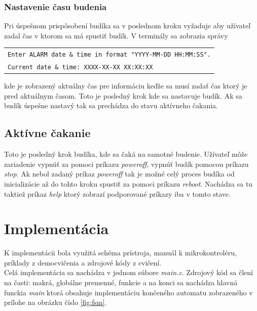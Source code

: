 \documentclass[11pt,a4paper]{article}
\begin{document}
        \subsubsection{Nastavenie času budenia}

            \indent Pri úspešnom prispôsobení budíka sa v poslednom kroku vyžaduje aby užívateľ zadal čas v ktorom sa má spustiť budík. V terminály sa zobrazia správy
            \begin{center}
                \begin{tabular}{l}
                    \texttt{Enter ALARM date \& time in format "YYYY-MM-DD HH:MM:SS".}\\
                    \texttt{Current date \& time: XXXX-XX-XX XX:XX:XX}
                \end{tabular}
            \end{center}
            kde je zobrazený aktuálny čas pre informáciu keďže sa musí zadať čas ktorý je pred aktuálnym časom. Toto je posledný krok kde sa nastavuje budík. Ak sa budík úspešne nastavý tak sa prechádza do stavu aktívneho čakania.

        \subsection{Aktívne čakanie}

            \indent Toto je posledný krok budíka, kde sa čaká na samotné budenie. Užívateľ môže zariadenie vypnúť za pomoci príkazu \textit{poweroff}, vypnúť budík pomocou príkazu \textit{stop}. Ak nebol zadaný príkaz \textit{poweroff} tak je možné celý proces budíka od inicializácie až do tohto kroku spustiť za pomoci príkazu \textit{reboot}. Nachádza sa tu taktiež príkaz \textit{help} ktorý zobrazí podporované príkazy iba v tomto stave.


\section{Implementácia}

    \indent K implementácii bola využitá schéma prístroja\cite{SCHEME}, manuál k mikrokontroléru\cite{MANUAL}, príklady z democvičenia a zdrojové kódy z cvičení.\\

    \indent Celá implementácia sa nachádza v jednom súbore \textit{main.c}. Zdrojový kód sa člení na časti: makrá, globálne premenné, funkcie a na konci sa nachádza hlavná funckia \textit{main} ktorá obsahuje implementáciu končeného automatu zobrazeného v prílohe na obrázku číslo \ref{fig:fsm}.\\
\end{document}

